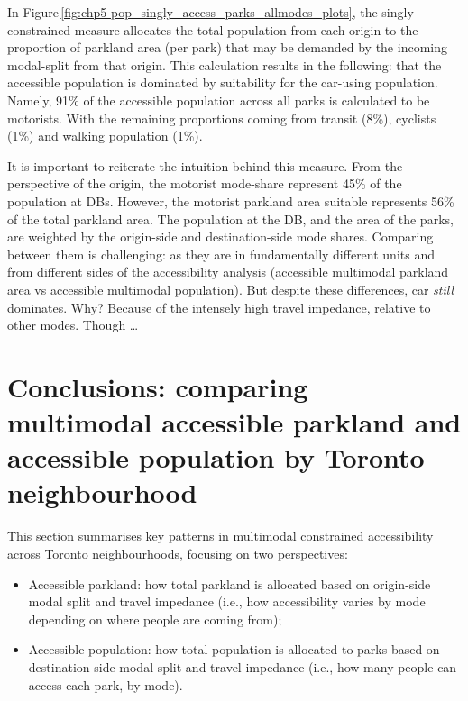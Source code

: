 \documentclass[
11pt, %
oneside, %
english, %
singlespacing, %
]{macthesis} %
\def\tightlist{}
\begin{document}
In Figure\,\ref{fig:chp5-pop_singly_access_parks_allmodes_plots}, the singly constrained measure allocates the total population from each origin to the proportion of parkland area (per park) that may be demanded by the incoming modal-split from that origin. This calculation results in the following: that the accessible population is dominated by suitability for the car-using population. Namely, 91\% of the accessible population across all parks is calculated to be motorists. With the remaining proportions coming from transit (8\%), cyclists (1\%) and walking population (1\%).

It is important to reiterate the intuition behind this measure. From the perspective of the origin, the motorist mode-share represent 45\% of the population at DBs. However, the motorist parkland area suitable represents 56\% of the total parkland area. The population at the DB, and the area of the parks, are weighted by the origin-side and destination-side mode shares. Comparing between them is challenging: as they are in fundamentally different units and from different sides of the accessibility analysis (accessible multimodal parkland area vs accessible multimodal population). But despite these differences, car \emph{still} dominates. Why? Because of the intensely high travel impedance, relative to other modes. Though \ldots{}

\section{Conclusions: comparing multimodal accessible parkland and accessible population by Toronto neighbourhood}\label{conclusions-comparing-multimodal-accessible-parkland-and-accessible-population-by-toronto-neighbourhood}

This section summarises key patterns in multimodal constrained accessibility across Toronto neighbourhoods, focusing on two perspectives:

\begin{itemize}
\tightlist
\item
  Accessible parkland: how total parkland is allocated based on origin-side modal split and travel impedance (i.e., how accessibility varies by mode depending on where people are coming from);
\item
  Accessible population: how total population is allocated to parks based on destination-side modal split and travel impedance (i.e., how many people can access each park, by mode).
\end{itemize}
\end{document}
